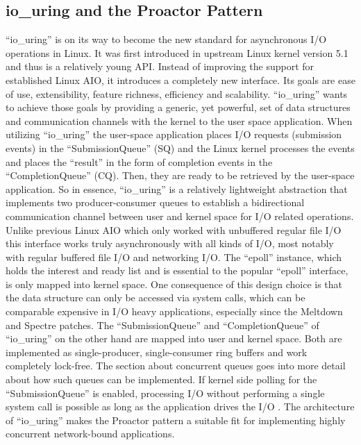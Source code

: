 \subsection{io\_uring and the Proactor Pattern}
“io\_uring” is on its way to become the new standard for asynchronous I/O operations in Linux. It was first introduced in upstream Linux kernel version 5.1 and thus is a relatively young API. Instead of improving the support for established Linux AIO, it introduces a completely new interface. Its goals are ease of use, extensibility, feature richness, efficiency and scalability. “io\_uring” wants to achieve those goals by providing a generic, yet powerful, set of data structures and communication channels with the kernel to the user space application. \newline
When utilizing “io\_uring” the user-space application places I/O requests (submission events) in the “SubmissionQueue” (SQ) and the Linux kernel processes the events and places the “result” in the form of completion events in the “CompletionQueue” (CQ). Then, they are ready to be retrieved by the user-space application. So in essence, “io\_uring” is a relatively lightweight abstraction that implements two producer-consumer queues to establish a bidirectional communication channel between user and kernel space for I/O related operations. 
Unlike previous Linux AIO which only worked with unbuffered regular file I/O this interface works truly asynchronously with all kinds of I/O, most notably with regular buffered file I/O and networking I/O. \newline
The “epoll” instance, which holds the interest and ready list and is essential to the popular “epoll” interface, is only mapped into kernel space. One consequence of this design choice is that the data structure can only be accessed via system calls, which can be comparable expensive in I/O heavy applications, especially since the Meltdown and Spectre patches.
The “SubmissionQueue” and “CompletionQueue” of “io\_uring” on the other hand are mapped into user and kernel space. Both are implemented as single-producer, single-consumer ring buffers and work completely lock-free. The section about concurrent queues goes into more detail about how such queues can be implemented. If kernel side polling for the “SubmissionQueue” is enabled, processing I/O without performing a single system call is possible as long as the application drives the I/O \cite{linux:io_uring}. \newline
The architecture of “io\_uring” makes the Proactor pattern a suitable fit for implementing highly concurrent network-bound applications. 
